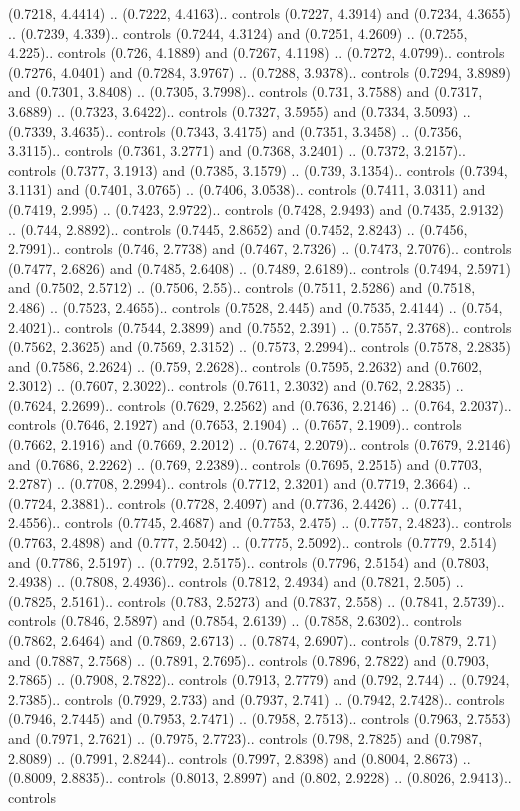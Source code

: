 (0.7218, 4.4414) .. (0.7222, 4.4163).. controls (0.7227, 4.3914) and (0.7234, 4.3655) .. (0.7239, 4.339).. controls (0.7244, 4.3124) and (0.7251, 4.2609) .. (0.7255, 4.225).. controls (0.726, 4.1889) and (0.7267, 4.1198) .. (0.7272, 4.0799).. controls (0.7276, 4.0401) and (0.7284, 3.9767) .. (0.7288, 3.9378).. controls (0.7294, 3.8989) and (0.7301, 3.8408) .. (0.7305, 3.7998).. controls (0.731, 3.7588) and (0.7317, 3.6889) .. (0.7323, 3.6422).. controls (0.7327, 3.5955) and (0.7334, 3.5093) .. (0.7339, 3.4635).. controls (0.7343, 3.4175) and (0.7351, 3.3458) .. (0.7356, 3.3115).. controls (0.7361, 3.2771) and (0.7368, 3.2401) .. (0.7372, 3.2157).. controls (0.7377, 3.1913) and (0.7385, 3.1579) .. (0.739, 3.1354).. controls (0.7394, 3.1131) and (0.7401, 3.0765) .. (0.7406, 3.0538).. controls (0.7411, 3.0311) and (0.7419, 2.995) .. (0.7423, 2.9722).. controls (0.7428, 2.9493) and (0.7435, 2.9132) .. (0.744, 2.8892).. controls (0.7445, 2.8652) and (0.7452, 2.8243) .. (0.7456, 2.7991).. controls (0.746, 2.7738) and (0.7467, 2.7326) .. (0.7473, 2.7076).. controls (0.7477, 2.6826) and (0.7485, 2.6408) .. (0.7489, 2.6189).. controls (0.7494, 2.5971) and (0.7502, 2.5712) .. (0.7506, 2.55).. controls (0.7511, 2.5286) and (0.7518, 2.486) .. (0.7523, 2.4655).. controls (0.7528, 2.445) and (0.7535, 2.4144) .. (0.754, 2.4021).. controls (0.7544, 2.3899) and (0.7552, 2.391) .. (0.7557, 2.3768).. controls (0.7562, 2.3625) and (0.7569, 2.3152) .. (0.7573, 2.2994).. controls (0.7578, 2.2835) and (0.7586, 2.2624) .. (0.759, 2.2628).. controls (0.7595, 2.2632) and (0.7602, 2.3012) .. (0.7607, 2.3022).. controls (0.7611, 2.3032) and (0.762, 2.2835) .. (0.7624, 2.2699).. controls (0.7629, 2.2562) and (0.7636, 2.2146) .. (0.764, 2.2037).. controls (0.7646, 2.1927) and (0.7653, 2.1904) .. (0.7657, 2.1909).. controls (0.7662, 2.1916) and (0.7669, 2.2012) .. (0.7674, 2.2079).. controls (0.7679, 2.2146) and (0.7686, 2.2262) .. (0.769, 2.2389).. controls (0.7695, 2.2515) and (0.7703, 2.2787) .. (0.7708, 2.2994).. controls (0.7712, 2.3201) and (0.7719, 2.3664) .. (0.7724, 2.3881).. controls (0.7728, 2.4097) and (0.7736, 2.4426) .. (0.7741, 2.4556).. controls (0.7745, 2.4687) and (0.7753, 2.475) .. (0.7757, 2.4823).. controls (0.7763, 2.4898) and (0.777, 2.5042) .. (0.7775, 2.5092).. controls (0.7779, 2.514) and (0.7786, 2.5197) .. (0.7792, 2.5175).. controls (0.7796, 2.5154) and (0.7803, 2.4938) .. (0.7808, 2.4936).. controls (0.7812, 2.4934) and (0.7821, 2.505) .. (0.7825, 2.5161).. controls (0.783, 2.5273) and (0.7837, 2.558) .. (0.7841, 2.5739).. controls (0.7846, 2.5897) and (0.7854, 2.6139) .. (0.7858, 2.6302).. controls (0.7862, 2.6464) and (0.7869, 2.6713) .. (0.7874, 2.6907).. controls (0.7879, 2.71) and (0.7887, 2.7568) .. (0.7891, 2.7695).. controls (0.7896, 2.7822) and (0.7903, 2.7865) .. (0.7908, 2.7822).. controls (0.7913, 2.7779) and (0.792, 2.744) .. (0.7924, 2.7385).. controls (0.7929, 2.733) and (0.7937, 2.741) .. (0.7942, 2.7428).. controls (0.7946, 2.7445) and (0.7953, 2.7471) .. (0.7958, 2.7513).. controls (0.7963, 2.7553) and (0.7971, 2.7621) .. (0.7975, 2.7723).. controls (0.798, 2.7825) and (0.7987, 2.8089) .. (0.7991, 2.8244).. controls (0.7997, 2.8398) and (0.8004, 2.8673) .. (0.8009, 2.8835).. controls (0.8013, 2.8997) and (0.802, 2.9228) .. (0.8026, 2.9413).. controls 